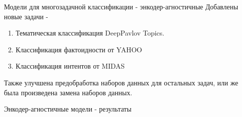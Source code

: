 \begin{frame}{Модели для многозадачной классификации - энкодер-агностичные}
Добавлены новые задачи - 
\begin{enumerate}
    \item Тематическая классификация DeepPavlov Topics.
    \item Классификация фактоидности от YAHOO
    \item Классификация интентов от MIDAS
\end{enumerate}
Также улучшена предобработка наборов данных для остальных задач, или же была произведена замена наборов данных.
\end{frame}
\begin{frame}{Энкодер-агностичные модели - результаты}
\begin{table}[htbp]
\caption{Точность/взвешенный-F1) для оценки моделей в экспериментах с энкодер-агностичными моделями. Для не-Коботовских задач при оценке используются оригинальные тестовые наборы данных, для коботовских -- тестовая часть разбиения данных. «С историей» означает использование диалоговой истории только в задаче MIDAS. «Размер» означает размер обучающей выборки.}
\end{table}
\end{frame}
